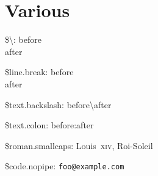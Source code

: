 \documentclass[ebook,demo]{pyscribe}
\begin{document}
\section{Various}

\par\$\textbackslash{}: before \\ after
\par\$line.break: before \\ after

\par\$text.backslash: before\textbackslash{}after
\par\$text.colon: before\string:after
\par\$roman.smallcaps: Louis~\textsc{xiv}, Roi-Soleil
\par\$code.nopipe: \verb|foo@example.com|
\end{document}
